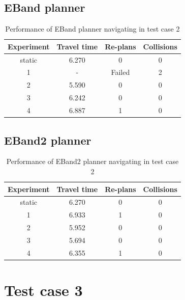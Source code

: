\subsection{EBand planner}%
\label{sub:eval_eband_planner_tc2}

\begin{table}[H]
    \centering
    \begin{tabular}{cccc}
        \textbf{Experiment} & \textbf{Travel time} & \textbf{Re-plans} & \textbf{Collisions} \\\toprule
        static & 6.270 & 0 & 0 \\
             1 & \-- & Failed & 2 \\
             2 & 5.590 & 0 & 0 \\
             3 & 6.242 & 0 & 0 \\
             4 & 6.887 & 1 & 0 \\
    \end{tabular}
    \caption{Performance of EBand planner navigating in test case 2}\label{tab:perfomance_eband_test_case_2}
\end{table}


\subsection{EBand2 planner}%
\label{sub:eval_eband2_planner_tc2}

\begin{table}[H]
    \centering
    \begin{tabular}{cccc}
        \textbf{Experiment} & \textbf{Travel time} & \textbf{Re-plans} & \textbf{Collisions} \\\toprule
        static & 6.270 & 0 & 0 \\
             1 & 6.933 & 1 & 0 \\
             2 & 5.952 & 0 & 0 \\
             3 & 5.694 & 0 & 0 \\
             4 & 6.355 & 1 & 0 \\
    \end{tabular}
    \caption{Performance of EBand2 planner navigating in test case 2}\label{tab:perfomance_eband2_test_case_2}
\end{table}

\newpage{}
\section{Test case 3}%
\label{sec:test_case_3}

